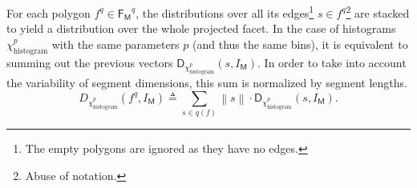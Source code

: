         \begin{figure}[htpb]
            \begin{center}
            \end{center}
        \end{figure}

        For each polygon \(f^q \in \mathsf{F_M}^q\), the distributions over all its edges\footnote{The empty polygons are ignored as they have no edges.} \(s \in f^q\)\footnote{Abuse of notation.} are stacked to yield a distribution over the whole projected facet.
        In the case of histograms $\chi^p_{\operatorname{histogram}}$ with the same parameters \(p\) (and thus the same bins), it is equivalent to summing out the previous vectors $\mathsf{D}_{\chi^p_{\operatorname{histogram}}}(s, I_{\mathsf{M}})$.
        In order to take into account the variability of segment dimensions, this sum is normalized by segment lengths.\\
        \begin{equation}
            \label{eq::corr_fac}
            D_{\chi^p_{\operatorname{histogram}}}\left(f^q, I_{\mathsf{M}}\right) \triangleq \sum_{s \in q\left(f\right)} \left\rVert s \right\lVert \cdot \mathsf{D}_{\chi^p_{\operatorname{histogram}}}(s, I_{\mathsf{M}}).
        \end{equation}

